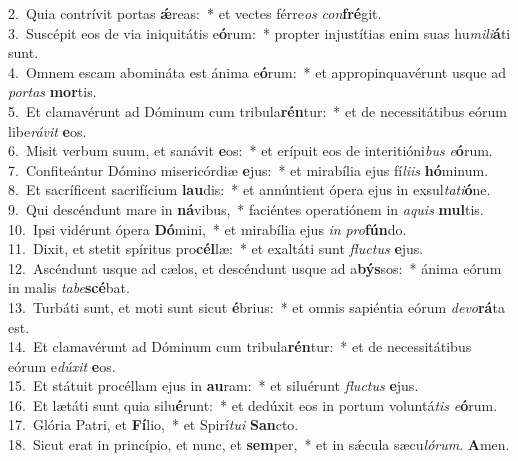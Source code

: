 {2.~}Quia contrívit portas \textbf{ǽ}reas:~* et vectes férre\textit{os} \textit{con}\textbf{fré}git.\\
{3.~}Suscépit eos de via iniquitátis e\textbf{ó}rum:~* propter injustítias enim suas hu\textit{mi}\textit{li}\textbf{á}ti sunt.\\
{4.~}Omnem escam abomináta est ánima e\textbf{ó}rum:~* et appropinquavérunt usque ad \textit{por}\textit{tas} \textbf{mor}tis.\\
{5.~}Et clamavérunt ad Dóminum cum tribula\textbf{rén}tur:~* et de necessitátibus eórum libe\textit{rá}\textit{vit} \textbf{e}os.\\
{6.~}Misit verbum suum, et sanávit \textbf{e}os:~* et erípuit eos de interitióni\textit{bus} \textit{e}\textbf{ó}rum.\\
{7.~}Confiteántur Dómino misericórdiæ \textbf{e}jus:~* et mirabília ejus fí\textit{li}\textit{is} \textbf{hó}minum.\\
{8.~}Et sacríficent sacrifícium \textbf{lau}dis:~* et annúntient ópera ejus in exsul\textit{ta}\textit{ti}\textbf{ó}ne.\\
{9.~}Qui descéndunt mare in \textbf{ná}vibus,~* faciéntes operatiónem in \textit{a}\textit{quis} \textbf{mul}tis.\\
{10.~}Ipsi vidérunt ópera \textbf{Dó}mini,~* et mirabília ejus \textit{in} \textit{pro}\textbf{fún}do.\\
{11.~}Dixit, et stetit spíritus pro\textbf{cél}læ:~* et exaltáti sunt \textit{flu}\textit{ctus} \textbf{e}jus.\\
{12.~}Ascéndunt usque ad cælos, et descéndunt usque ad a\textbf{býs}sos:~* ánima eórum in malis \textit{ta}\textit{be}\textbf{scé}bat.\\
{13.~}Turbáti sunt, et moti sunt sicut \textbf{é}brius:~* et omnis sapiéntia eórum \textit{de}\textit{vo}\textbf{rá}ta est.\\
{14.~}Et clamavérunt ad Dóminum cum tribula\textbf{rén}tur:~* et de necessitátibus eórum e\textit{dú}\textit{xit} \textbf{e}os.\\
{15.~}Et státuit procéllam ejus in \textbf{au}ram:~* et siluérunt \textit{flu}\textit{ctus} \textbf{e}jus.\\
{16.~}Et lætáti sunt quia silu\textbf{é}runt:~* et dedúxit eos in portum voluntá\textit{tis} \textit{e}\textbf{ó}rum.\\
{17.~}Glória Patri, et \textbf{Fí}lio,~* et Spirí\textit{tu}\textit{i} \textbf{San}cto.\\
{18.~}Sicut erat in princípio, et nunc, et \textbf{sem}per,~* et in sǽcula sæcu\textit{ló}\textit{rum}. \textbf{A}men.\\
